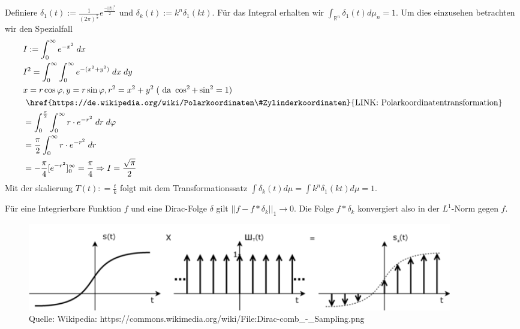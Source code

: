 \begin{Beispiel}
\label{Diracfolgeb}
Definiere $\delta_1 (t) := \frac{1}{(2 \pi)^{\frac{n}{2}}} e^{ \frac{ - || t ||^2}{2}}$ und $\delta_k(t) := k^n \delta_1(k t)$.  
Für das Integral erhalten wir $\int_{\mathbb{R}^n} \delta_1 (t)  d \mu_n = 1$. Um dies einzusehen betrachten wir den Spezialfall
\begin{align*}
& I := \int_{0}^{\infty} e^{-x^2} \; dx\\
& I^2 = \int_{0}^{\infty} \int_{0}^{\infty} e^{-(x^2+y^2)} \; dx \;dy \\
&x=r \cos \varphi ,y=r\sin \varphi ,r^2 = x^2 + y^2  \; (\text{ da } \cos^2 + \sin^2 = 1)\\
 &\text{ \href{https://de.wikipedia.org/wiki/Polarkoordinaten\#Zylinderkoordinaten}{LINK: Polarkoordinatentransformation}} \\
& = \int_{0}^{\frac{\pi}{2}}  \int_{0}^{\infty}r \cdot e^{-r^2} \; dr \;d\varphi \\
&= \frac{\pi}{2} \int_{0}^{\infty}r \cdot e^{-r^2} \; dr \\
&= -\frac{\pi}{4} [e^{-r^2} ]_0^{\infty} = \frac{\pi}{4} \Rightarrow I = \frac{\sqrt{\pi}}{2}
\end{align*}
Mit der skalierung $T(t) : = \frac{t}{k}$ folgt mit dem Transformationssatz $\int \delta_k (t) d \mu = \int  k^n \delta_1(k t) d \mu = 1$.
\end{Beispiel}

\begin{Satz}[Approximationssatz]
Für eine Integrierbare Funktion $f$ und eine Dirac-Folge $\delta$ gilt $|| f -  f *\delta_k ||_1 \to 0 $. Die Folge  $f *\delta_k$ konvergiert also in der $L^1$-Norm gegen $f$.
\end{Satz}
\begin{figure}[H]
      \centering
    \includegraphics[width=0.9\textwidth]{images/640px-Dirac-comb_-_Sampling}
\caption{Quelle: Wikipedia: https://commons.wikimedia.org/wiki/File:Dirac-comb\_-\_Sampling.png}
\end{figure}



